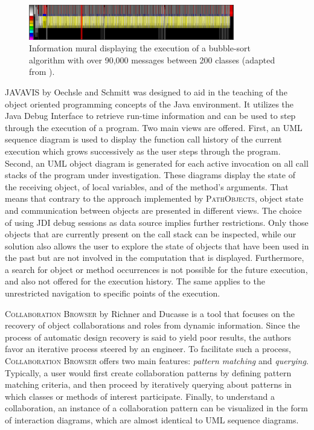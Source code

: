 \begin{figure}[tb]
	\centering
	\includegraphics[width=0.8\textwidth]{../images/06-Mural}
	\caption[Information Mural by Jerding et al.]{Information mural displaying the execution of a bubble-sort algorithm with over 90,000 messages between 200 classes (adapted from \cite{jerding_information_1998}).}
	\label{fig:06-2-Mural}
\end{figure}


\textsc{JAVAVIS} by Oechsle and Schmitt \cite{diehl_javavis:_2002} was designed to aid in the teaching of the object oriented programming concepts of the Java environment.
It utilizes the Java Debug Interface to retrieve run-time information and can be used to step through the execution of a program.
Two main views are offered.
First, an UML sequence diagram is used to display the function call history of the current execution which grows successively as the user steps through the program.
Second, an UML object diagram is generated for each active invocation on all call stacks of the program under investigation.
These diagrams display the state of the receiving object, of local variables, and of the method's arguments.
That means that contrary to the approach implemented by \textsc{PathObjects}, object state and communication between objects are presented in different views.
The choice of using JDI debug sessions as data source implies further restrictions.
Only those objects that are currently present on the call stack can be inspected, while our solution also allows the user to explore the state of objects that have been used in the past but are not involved in the computation that is displayed.
Furthermore, a search for object or method occurrences is not possible for the future execution, and also not offered for the execution history.
The same applies to the unrestricted navigation to specific points of the execution.

\textsc{Collaboration Browser} by Richner and Ducasse \cite{richner_using_2002} is a tool that focuses on the recovery of object collaborations and roles from dynamic information.
Since the process of automatic design recovery is said to yield poor results, the authors favor an iterative process steered by an engineer.
To facilitate such a process, \textsc{Collaboration Browser} offers two main features: \emph{pattern matching} and \emph{querying}. 
Typically, a user would first create collaboration patterns by defining pattern matching criteria, and then proceed by iteratively querying about patterns in which classes or methods of interest participate.
Finally, to understand a collaboration, an instance of a collaboration pattern can be visualized in the form of interaction diagrams, which are almost identical to UML sequence diagrams. 

